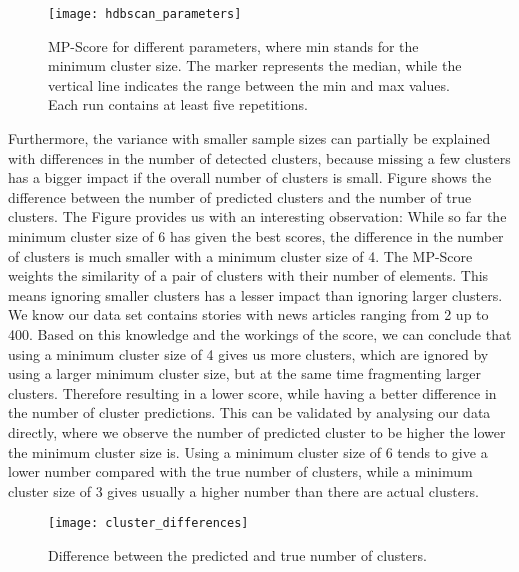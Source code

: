 \begin{figure}[h]
    \centering
    \texttt{[image: hdbscan\_parameters]}
    \caption{
        MP-Score for different parameters, where min stands for the minimum cluster size.
        The marker represents the median, while the vertical line indicates the range between the min and max values.
        Each run contains at least five repetitions.
    }
    \label{fig:hdbscan_parameters}
\end{figure}

Furthermore, the variance with smaller sample sizes can partially be explained
with differences in the number of detected clusters,
because missing a few clusters has a bigger impact if the overall number of clusters is small.
Figure \label{fig:cluster_difference_samples} shows the difference between the number of predicted clusters
and the number of true clusters.
The Figure provides us with an interesting observation:
While so far the minimum cluster size of 6 has given the best scores,
the difference in the number of clusters is much smaller with a minimum cluster size of 4.
The MP-Score weights the similarity of a pair of clusters with their number of elements.
This means ignoring smaller clusters has a lesser impact than ignoring larger clusters.
We know our data set contains stories with news articles ranging from 2 up to 400.
Based on this knowledge and the workings of the score,
we can conclude that using a minimum cluster size of 4 gives us more clusters,
which are ignored by using a larger minimum cluster size, but at the same time fragmenting larger clusters.
Therefore resulting in a lower score, while having a better difference in the number of cluster predictions.
This can be validated by analysing our data directly,
where we observe the number of predicted cluster to be higher the lower the minimum cluster size is.
Using a minimum cluster size of 6 tends to give a lower number compared with the true number of clusters,
while a minimum cluster size of 3 gives usually a higher number than there are actual clusters.

\begin{figure}[h]
    \centering
    \texttt{[image: cluster\_differences]}
    \caption{Difference between the predicted and true number of clusters.}
    \label{fig:cluster_differences}
\end{figure}

